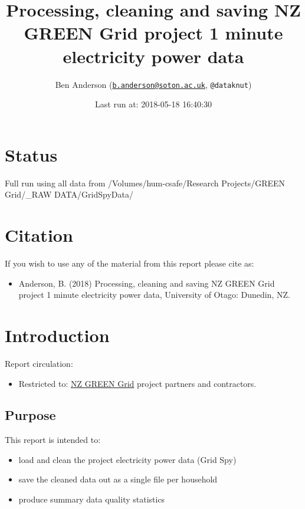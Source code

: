 \documentclass[]{article}
\title{Processing, cleaning and saving NZ GREEN Grid project 1 minute
electricity power data}
\author{Ben Anderson
(\href{mailto:b.anderson@soton.ac.uk}{\nolinkurl{b.anderson@soton.ac.uk}},
\texttt{@dataknut})}
\date{Last run at: 2018-05-18 16:40:30}
\providecommand{\tightlist}{%
  \setlength{\itemsep}{0pt}\setlength{\parskip}{0pt}}
\begin{document}
\maketitle

{
\setcounter{tocdepth}{2}
\tableofcontents
}
\newpage

\section{Status}\label{status}

Full run using all data from /Volumes/hum-csafe/Research Projects/GREEN
Grid/\_RAW DATA/GridSpyData/

\section{Citation}\label{citation}

If you wish to use any of the material from this report please cite as:

\begin{itemize}
\tightlist
\item
  Anderson, B. (2018) Processing, cleaning and saving NZ GREEN Grid
  project 1 minute electricity power data, University of Otago: Dunedin,
  NZ.
\end{itemize}

\newpage

\section{Introduction}\label{introduction}

Report circulation:

\begin{itemize}
\tightlist
\item
  Restricted to:
  \href{https://www.otago.ac.nz/centre-sustainability/research/energy/otago050285.html}{NZ
  GREEN Grid} project partners and contractors.
\end{itemize}

\subsection{Purpose}\label{purpose}

This report is intended to:

\begin{itemize}
\tightlist
\item
  load and clean the project electricity power data (Grid Spy)
\item
  save the cleaned data out as a single file per household
\item
  produce summary data quality statistics
\end{itemize}
\end{document}
